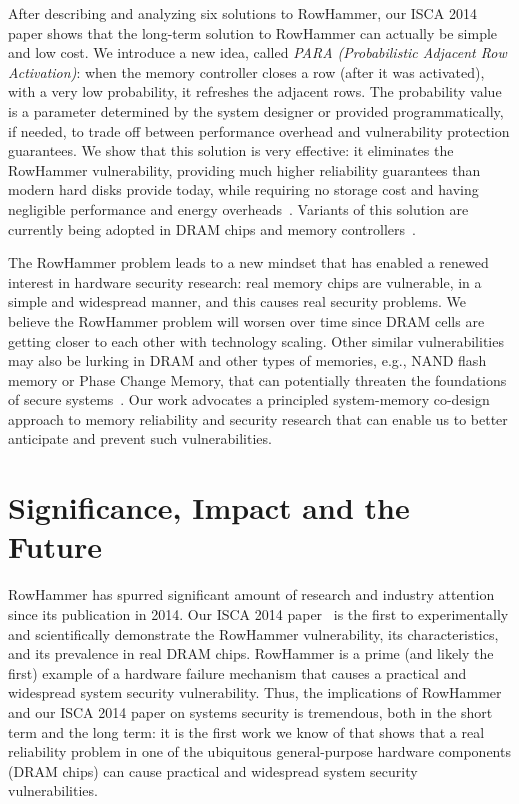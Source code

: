 \documentclass[runningheads]{llncs}
\begin{document}
After describing and analyzing six solutions to RowHammer, our ISCA
2014 paper shows that the long-term solution to RowHammer can actually
be simple and low cost. We introduce a new idea, called {\em PARA
  (Probabilistic Adjacent Row Activation)}: when the memory controller
closes a row (after it was activated), with a very low probability, it
refreshes the adjacent rows. The probability value is a parameter
determined by the system designer or provided programmatically, if
needed, to trade off between performance overhead and vulnerability
protection guarantees. We show that this solution is very effective:
it eliminates the RowHammer vulnerability, providing much higher
reliability guarantees than modern hard disks provide today, while
requiring no storage cost and having negligible performance and energy
overheads~\cite{rowhammer-isca2014}. Variants of this solution are
currently being adopted in DRAM chips and memory
controllers~\cite{x210-github,x210-rh-ss}.

The RowHammer problem leads to a new mindset that has enabled a renewed
interest in hardware security research: real memory chips are
vulnerable, in a simple and widespread manner, and this causes real
security problems.  We believe the RowHammer problem will worsen over
time since DRAM cells are getting closer to each other with technology
scaling. Other similar vulnerabilities may also be lurking in DRAM and
other types of memories, e.g., NAND flash memory or Phase Change
Memory, that can potentially threaten the foundations of secure
systems~\cite{onur-date17}. Our work advocates a principled
system-memory co-design approach to memory reliability and security
research that can enable us to better anticipate and prevent such
vulnerabilities.

%
%
%


\section{Significance, Impact and the Future}
  
RowHammer has spurred significant amount of research and industry
attention since its publication in 2014. Our ISCA 2014
paper~\cite{rowhammer-isca2014} is the first to experimentally and scientifically 
demonstrate the RowHammer vulnerability, its characteristics, and its prevalence in
real DRAM chips. RowHammer is a prime (and likely the first) example
of a hardware failure mechanism that causes a practical and widespread
system security vulnerability. Thus, the implications of RowHammer and
our ISCA 2014 paper on systems security is tremendous, both in the
short term and the long term: it is the first work we know of that
shows that a real reliability problem in one of the ubiquitous
general-purpose hardware components (DRAM chips) can cause practical
and widespread system security vulnerabilities.
\end{document}
